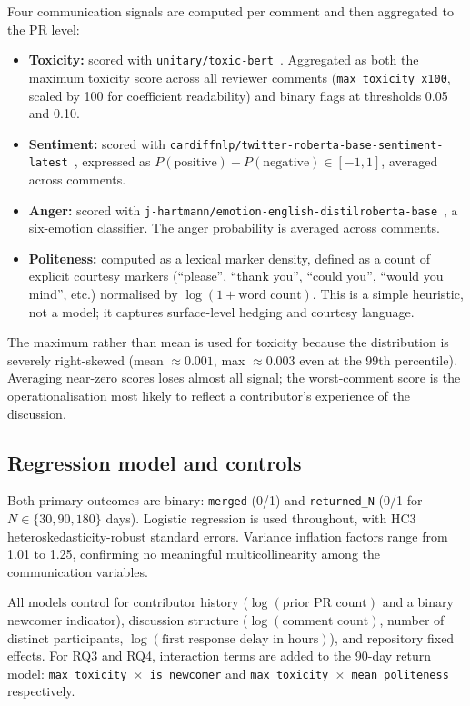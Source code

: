 \documentclass[12pt,a4paper]{article}
\begin{document}
Four communication signals are computed per comment and then aggregated to the PR level:

\begin{itemize}\setlength\itemsep{2pt}
  \item \textbf{Toxicity:} scored with \texttt{unitary/toxic-bert}~\cite{hanu2020}. Aggregated as both the maximum toxicity score across all reviewer comments (\texttt{max\_toxicity\_x100}, scaled by 100 for coefficient readability) and binary flags at thresholds 0.05 and 0.10.
  \item \textbf{Sentiment:} scored with \texttt{cardiffnlp/twitter-roberta-base-sentiment-latest}~\cite{barbieri2020}, expressed as $P(\text{positive}) - P(\text{negative}) \in [-1, 1]$, averaged across comments.
  \item \textbf{Anger:} scored with \texttt{j-hartmann/emotion-english-distilroberta-base}~\cite{hartmann2022}, a six-emotion classifier. The anger probability is averaged across comments.
  \item \textbf{Politeness:} computed as a lexical marker density, defined as a count of explicit courtesy markers (``please'', ``thank you'', ``could you'', ``would you mind'', etc.) normalised by $\log(1 + \text{word count})$. This is a simple heuristic, not a model; it captures surface-level hedging and courtesy language.
\end{itemize}

The maximum rather than mean is used for toxicity because the distribution is severely right-skewed (mean $\approx 0.001$, max $\approx 0.003$ even at the 99th percentile). Averaging near-zero scores loses almost all signal; the worst-comment score is the operationalisation most likely to reflect a contributor's experience of the discussion.

\subsection{Regression model and controls}

Both primary outcomes are binary: \texttt{merged} (0/1) and \texttt{returned\_N} (0/1 for $N \in \{30, 90, 180\}$ days). Logistic regression is used throughout, with HC3 heteroskedasticity-robust standard errors. Variance inflation factors range from 1.01 to 1.25, confirming no meaningful multicollinearity among the communication variables.

All models control for contributor history ($\log(\text{prior PR count})$ and a binary newcomer indicator), discussion structure ($\log(\text{comment count})$, number of distinct participants, $\log(\text{first response delay in hours})$), and repository fixed effects. For RQ3 and RQ4, interaction terms are added to the 90-day return model: \texttt{max\_toxicity $\times$ is\_newcomer} and \texttt{max\_toxicity $\times$ mean\_politeness} respectively.
\end{document}
